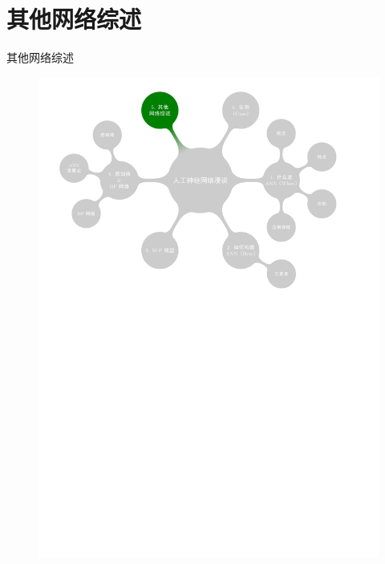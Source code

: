 \documentclass[xcolor=svgnames]{beamer}
\begin{document}
\section{其他网络综述}
\label{sec:other}

\begin{frame}{其他网络综述}
    \vspace{-1em}
  \begin{figure}
    \centering
    \includegraphics[width=\textwidth]{mindmap/map6.pdf}
  \end{figure}
\end{frame}
\end{document}
